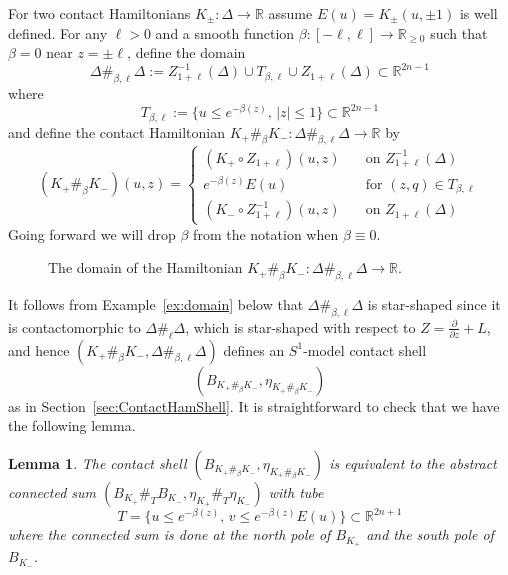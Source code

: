 \documentclass[12pt]{paper}
\theoremstyle{plain}
\newtheorem{lemma}[theorem]{Lemma}
\theoremstyle{definition}
\newcommand{\p}{\partial}
\newcommand{\abs}[1]{\left| #1 \right|}
\newcommand{\R}{{\mathbb{R}}}
\numberwithin{figure}{section}
\begin{document}
For two contact Hamiltonians $K_\pm: \Delta \to \R$ assume $E(u) = K_\pm(u, \pm 1)$ is well defined.
For any $\ell > 0$ and a smooth function $\beta: [-\ell, \ell] \to \R_{\geq 0}$ such that $\beta = 0$ near $z = \pm\ell$,
define the domain
\begin{equation}\label{e:ConnectedSumDomain}
	\Delta\#_{\beta, \ell}\Delta := Z_{1+\ell}^{-1}(\Delta) \cup T_{\beta, \ell} \cup Z_{1+\ell}(\Delta) \subset \R^{2n-1}
\end{equation}
where 
\begin{equation}\label{e:domaintube}
T_{\beta, \ell} := \{u \leq e^{-\beta(z)},\, \abs{z} \leq 1\} \subset \R^{2n-1}
\end{equation}
 and define the contact Hamiltonian 
$K_+ \#_{\beta} K_-: \Delta\#_{\beta, \ell}\Delta \to \R$ by
$$
	(K_+\#_\beta K_-)(u,z) = \begin{cases}
	(K_+ \circ Z_{1+\ell})(u,z)&\quad\mbox{on $Z_{1+\ell}^{-1}(\Delta)$}\\
	e^{-\beta(z)} E(u) &\quad\mbox{for $(z,q) \in T_{\beta, \ell}$}\\
	(K_- \circ Z_{1+\ell}^{-1})(u,z) &\quad\mbox{on $Z_{1+\ell}(\Delta)$}
	\end{cases}
$$
Going forward we will drop $\beta$ from the notation when $\beta \equiv 0$.
\begin{figure}
   \centering
   \def\svgwidth{400pt}
   
   \caption{The domain of the Hamiltonian $K_+\#_\beta K_-: \Delta\#_{\beta, \ell}\Delta \to \R$.}
  \label{f:ConnectSumDomain}
\end{figure} 

It follows from Example~\ref{ex:domain} below that
$\Delta\#_{\beta, \ell}\Delta$ is star-shaped since it is contactomorphic to $\Delta\#_{\ell} \Delta$, 
which is star-shaped with respect to $Z = \tfrac{\p}{\p z} + L$, and hence $(K_+ \#_\beta K_-, \Delta\#_{\beta, \ell}\Delta)$
defines an $S^1$-model contact shell 
$$(B_{K_+ \#_\beta K_-}, \eta_{K_+ \#_\beta K_-})$$
as in Section~\ref{sec:ContactHamShell}.  It is straightforward to check that we have the following lemma.
\begin{lemma}\label{l:abstract=S1}
	The contact shell $(B_{K_+ \#_\beta K_-}, \eta_{K_+ \#_\beta K_-})$ 
	is equivalent to the abstract connected sum $(B_{K_+} \#_T B_{K_-}, \eta_{K_+} \#_T \eta_{K_-})$
	with tube
	$$
		T = \{u \leq e^{-\beta(z)},\, v \leq e^{-\beta(z)}E(u)\} \subset \R^{2n+1}
	$$
	where the connected sum is done at the north pole of $B_{K_+}$ and the south pole of
	$B_{K_-}$.
\end{lemma}
\end{document}
